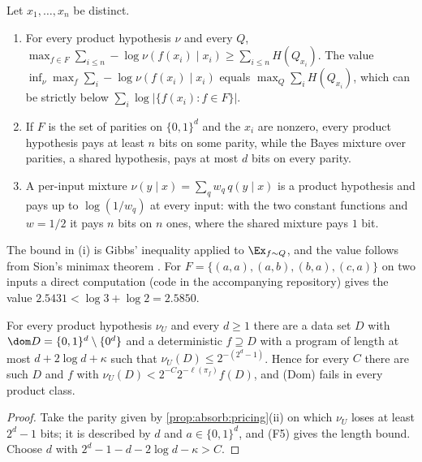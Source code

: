\begin{proposition}\label{prop:absorb:pricing}
Let $x_1,\dots,x_n$ be distinct.
\begin{enumerate}[label=(\roman*),itemsep=0pt]
\item For every product hypothesis $\nu$ and every $Q$, $\max_{f\in F}\sum_{i\le n}-\log\nu(f(x_i)\mid x_i)\ge\sum_{i\le n}H(Q_{x_i})$. The value $\inf_\nu\max_f\sum_i-\log\nu(f(x_i)\mid x_i)$ equals $\max_Q\sum_iH(Q_{x_i})$, which can be strictly below $\sum_i\log|\{f(x_i):f\in F\}|$.
\item If $F$ is the set of parities on $\{0,1\}^d$ and the $x_i$ are nonzero, every product hypothesis pays at least $n$ bits on some parity, while the Bayes mixture over parities, a shared hypothesis, pays at most $d$ bits on every parity.
\item A per-input mixture $\nu(y\mid x)=\sum_qw_q\,q(y\mid x)$ is a product hypothesis and pays up to $\log(1/w_q)$ at every input: with the two constant functions and $w=1/2$ it pays $n$ bits on $n$ ones, where the shared mixture pays $1$ bit.
\end{enumerate}
\end{proposition}

The bound in (i) is Gibbs' inequality applied to $\Ex_{f\sim Q}$, and the value follows from Sion's minimax theorem \citep{sion1958general}. For $F=\{(a,a),(a,b),(b,a),(c,a)\}$ on two inputs a direct computation (code in the accompanying repository) gives the value $2.5431<\log3+\log2=2.5850$.

\begin{corollary}\label{cor:absorb:nouniversal}
For every product hypothesis $\nu_U$ and every $d\ge1$ there are a data set $D$ with $\dom D=\{0,1\}^d\setminus\{0^d\}$ and a deterministic $f\supseteq D$ with a program of length at most $d+2\log d+\kappa$ such that $\nu_U(D)\le2^{-(2^d-1)}$. Hence for every $C$ there are such $D$ and $f$ with $\nu_U(D)<2^{-C}2^{-\ell(\pi_f)}f(D)$, and (Dom) fails in every product class.
\end{corollary}

\begin{proof}
Take the parity given by \cref{prop:absorb:pricing}(ii) on which $\nu_U$ loses at least $2^d-1$ bits; it is described by $d$ and $a\in\{0,1\}^d$, and (F5) gives the length bound. Choose $d$ with $2^d-1-d-2\log d-\kappa>C$.
\end{proof}


